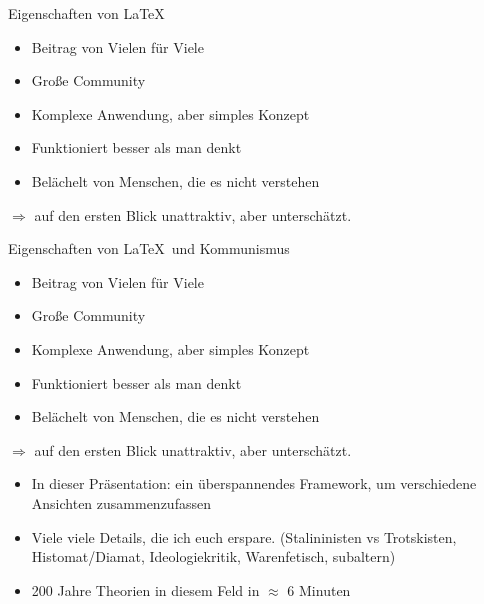 \documentclass{beamer}
\begin{document}
\begin{frame}{Eigenschaften von \LaTeX}
    \begin{itemize}
        \item<2-> Beitrag von Vielen für Viele
        \item<3-> Große Community
        \item<4-> Komplexe Anwendung, aber simples Konzept
        \item<5-> Funktioniert besser als man denkt
        \item<6-> Belächelt von Menschen, die es nicht verstehen
    \end{itemize}

        $\Rightarrow$ auf den ersten Blick unattraktiv, aber unterschätzt.
\end{frame}

\begin{frame}{Eigenschaften von \LaTeX\ und Kommunismus}
    \begin{itemize}
        \item Beitrag von Vielen für Viele
        \item Große Community
        \item Komplexe Anwendung, aber simples Konzept
        \item Funktioniert besser als man denkt
        \item Belächelt von Menschen, die es nicht verstehen
    \end{itemize}
        $\Rightarrow$ auf den ersten Blick unattraktiv, aber unterschätzt.
\end{frame}

\begin{frame}
\begin{itemize}
\item In dieser Präsentation: ein überspannendes Framework, um verschiedene Ansichten zusammenzufassen
\item Viele viele Details, die ich euch erspare. (Stalininisten vs Trotskisten, Histomat/Diamat, Ideologiekritik, Warenfetisch, subaltern)
\item 200 Jahre Theorien in diesem Feld in $\approx$ 6 Minuten
\end{itemize}
\end{frame}
\end{document}
